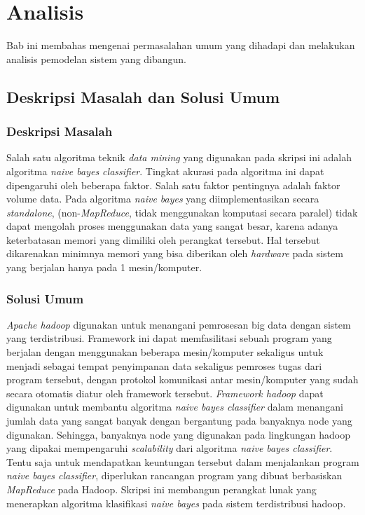 \chapter{Analisis}

Bab ini membahas mengenai permasalahan umum yang dihadapi dan melakukan analisis pemodelan sistem yang dibangun.

\section{Deskripsi Masalah dan Solusi Umum}
\subsection{Deskripsi Masalah}
Salah satu algoritma teknik \textit{data mining} yang digunakan pada skripsi ini adalah algoritma \textit{naive bayes classifier}. Tingkat akurasi pada algoritma ini dapat dipengaruhi oleh beberapa faktor. Salah satu faktor pentingnya adalah faktor volume data. Pada algoritma \textit{naive bayes} yang diimplementasikan secara \textit{standalone}, (non-\textit{MapReduce}, tidak menggunakan komputasi secara paralel) tidak dapat mengolah proses menggunakan data yang sangat besar, karena adanya keterbatasan memori yang dimiliki oleh perangkat tersebut. Hal tersebut dikarenakan minimnya memori yang bisa diberikan oleh \textit{hardware} pada sistem yang berjalan hanya pada 1 mesin/komputer.
\subsection{Solusi Umum}
\textit{Apache hadoop} digunakan untuk menangani pemrosesan big data dengan sistem yang terdistribusi. Framework ini dapat memfasilitasi sebuah program yang berjalan dengan menggunakan beberapa mesin/komputer sekaligus untuk menjadi sebagai tempat penyimpanan data sekaligus pemroses tugas dari program tersebut, dengan protokol komunikasi antar mesin/komputer yang sudah secara otomatis diatur oleh framework tersebut. \textit{Framework hadoop} dapat digunakan untuk membantu algoritma \textit{naive bayes classifier} dalam menangani jumlah data yang sangat banyak dengan bergantung pada banyaknya node yang digunakan. Sehingga, banyaknya node yang digunakan pada lingkungan hadoop yang dipakai mempengaruhi \textit{scalability} dari algoritma \textit{naive bayes classifier}. Tentu saja untuk mendapatkan keuntungan tersebut dalam menjalankan program \textit{naive bayes classifier}, diperlukan rancangan program yang dibuat berbasiskan \textit{MapReduce} pada Hadoop. Skripsi ini membangun perangkat lunak yang menerapkan algoritma klasifikasi \textit{naive bayes} pada sistem terdistribusi hadoop.

